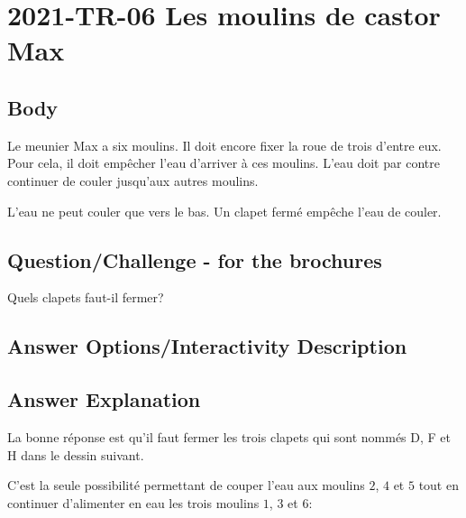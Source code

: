 \documentclass[a4paper,11pt]{report}
\newcommand{\taskGraphicsFolder}{..}
\begin{document}
\section*{\centering{} 2021-TR-06 Les moulins de castor Max}


\subsection*{Body}

Le meunier Max a six moulins. Il doit encore fixer la roue de trois d’entre eux. Pour cela, il doit empêcher l’eau d’arriver à ces moulins. L’eau doit par contre continuer de couler jusqu’aux autres moulins.

L’eau ne peut couler que vers le bas. Un clapet fermé empêche l’eau de couler.

{\em


\subsection*{Question/Challenge - for the brochures}

Quels clapets faut-il fermer?

{\centering%
\par}

}

\begingroup
\renewcommand{\arraystretch}{1.5}
\subsection*{Answer Options/Interactivity Description}



\endgroup

\subsection*{Answer Explanation}

La bonne réponse est qu’il faut fermer les trois clapets qui sont nommés D, F et H dans le dessin suivant.

{\centering%
\par}

C’est la seule possibilité permettant de couper l’eau aux moulins $2$, $4$ et $5$ tout en continuer d’alimenter en eau les trois moulins $1$, $3$ et $6$:
\end{document}
